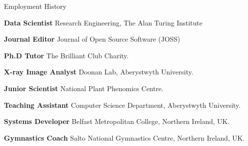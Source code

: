 \begin{rubric}{Employment History}


	\textbf{Data Scientist} Research Engineering, The Alan Turing Institute

	\textbf{Journal Editor} Journal of Open Source Software (JOSS)

\entry*[2019 -- 2022]%
	\textbf{Ph.D Tutor} The Brilliant Club Charity.

\entry*[2017 -- 2018]%
	\textbf{X-ray Image Analyst} Doonan Lab, Aberystwyth University.

\entry*[2016 -- 2017]%
	\textbf{Junior Scientist} National Plant Phenomics Centre.

\entry*[2015 -- 2018]%
	\textbf{Teaching Assistant} Computer Science Department, Aberystwyth
	University.
	
\entry*[2013 -- 2014]%
	\textbf{Systems Developer} Belfast Metropolitan College, Northern Ireland, UK.

\entry*[2013 -- 2014]%
	\textbf{Gymnastics Coach} Salto National Gymnastics Centre, Northern Ireland, UK.
%
\end{rubric}